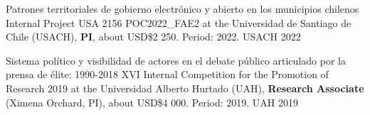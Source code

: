 \vspace{1mm}

\begin{cvhonors}
\cvhonor
{Patrones territoriales de gobierno electrónico y abierto en los municipios chilenos}
{Internal Project USA 2156 POC2022\_FAE2 at the Universidad de Santiago de Chile (USACH), {\bfseries PI}, about USD\$2 250. Period: 2022.} %
{USACH}
{2022}
\end{cvhonors}

\vspace{1mm}

\begin{cvhonors}
\cvhonor
{Sistema político y visibilidad de actores en el debate público articulado por la prensa de élite: 1990-2018}
{XVI Internal Competition for the Promotion of Research 2019 at the Universidad Alberto Hurtado (UAH), {\bfseries Research Associate} (Ximena Orchard, PI), about USD\$4 000. Period: 2019.} %
{UAH}
{2019}
\end{cvhonors}

\vspace{1mm}


